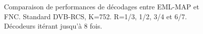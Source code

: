 
\begin{figure}[!t]
\centering
				
	\caption{Comparaison de performances de décodages entre EML-MAP et FNC. Standard DVB-RCS, K=752. R=1/3, 1/2, 3/4 et 6/7.
	Décodeurs itérant jusqu'à 8 fois. \label{fig:fnc_dvb_752}}
\end{figure}